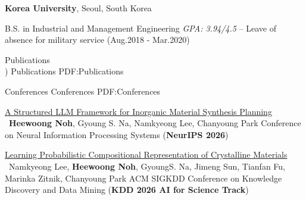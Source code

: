 \documentclass[letterpaper,MMMyyyy,nonstopmode]{simpleresumecv}
\begin{document}
\begin{Body}
\BigGap
\Entry
{\textbf{Korea University}},
Seoul, South Korea

\Gap
\BulletItem
B.S. in Industrial and Management Engineering {\textit{GPA: 3.94/4.5}}
\hfill
{} --
\Gap
\BulletItem
Leave of absence for military service (Aug.2018 - Mar.2020)



\Section
{Publications\\ \scriptsize{)}}
{Publications}
{PDF:Publications}





\SubSection
{Conferences}
{Conferences}
{PDF:Conferences}

\begingroup
\renewcommand{\MaxNumberedItem}{[8888]}

\Gap

\NumberedItem{[C7]}
\href{https://arxiv.org/abs/2602.07543}
{A Structured LLM Framework for Inorganic Material Synthesis Planning}
\newline
\ \textbf{Heewoong Noh}, Gyoung S. Na, Namkyeong Lee, Chanyoung Park
\newline
Conference on Neural Information Processing Systems (\textbf{NeurIPS 2026})

\NumberedItem{[C6]}
\href{https://arxiv.org/abs/2312.13289v2}
{Learning Probabilistic Compositional Representation of Crystalline Materials}
\newline
\ Namkyeong Lee, \textbf{Heewoong Noh}, GyoungS. Na, Jimeng Sun, Tianfan Fu, Marinka Zitnik, Chanyoung Park
\newline
ACM SIGKDD Conference on Knowledge Discovery and Data Mining (\textbf{KDD 2026 AI for Science Track})



\end{Body}
\end{document}
